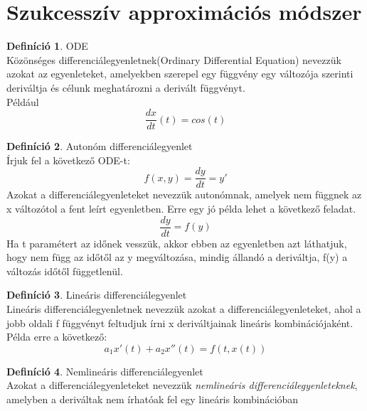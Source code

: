 \documentclass{article}
\theoremstyle{definition}
\theoremstyle{theorem}
\newtheorem{definition}{Definíció}
\begin{document}
\section{Szukcesszív approximációs módszer}

\begin{definition}{ODE}\\
Közönséges differenciálegyenletnek(Ordinary Differential Equation) nevezzük azokat az egyenleteket, amelyekben szerepel egy függvény egy változója szerinti deriváltja és célunk meghatározni a derivált függvényt.\\
Például
\begin{equation*}
    \frac{dx}{dt} (t) = cos(t)
\end{equation*}
\end{definition}

\begin{definition}Autonóm differenciálegyenlet\\
Írjuk fel a következő ODE-t:
\begin{equation*}
    f(x,y) = \frac{dy}{dt} = y'
\end{equation*}
Azokat a differenciálegyenleteket nevezzük autonómnak, amelyek nem függnek az x változótol a fent leírt egyenletben. Erre egy jó példa lehet a következő feladat. 
\begin{equation*}
    \frac{dy}{dt} = f(y)
\end{equation*}
Ha t paramétert az időnek vesszük, akkor ebben az egyenletben azt láthatjuk, hogy nem függ az időtől az y megváltozása, mindig állandó a deriváltja, f(y) a változás időtől függetlenül.
\end{definition}

\begin{definition}Lineáris differenciálegyenlet\\
Lineáris differenciálegyenletnek nevezzük azokat a differenciálegyenleteket, ahol a jobb oldali f függvényt feltudjuk írni x deriváltjainak lineáris kombinációjaként.
Példa erre a következő:
\begin{equation*}
    a_1 x'(t) + a_2 x''(t) = f(t,x(t))
\end{equation*}
\end{definition}

\begin{definition}Nemlineáris differenciálegyenlet\\
Azokat a differenciálegyenleteket nevezzük \textit{nemlineáris differenciálegyenleteknek}, amelyben a deriváltak nem írhatóak fel egy lineáris kombinációban
\end{definition}
\end{document}

